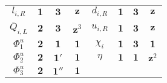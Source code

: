 \documentclass[english,10pt,aps,prd,a4paper,preprintnumbers,floatfix,nofootinbib,showpacs,superscriptaddress]{revtex4-1}
\begin{document}
\begin{table}[ht]
\begin{center}
\begin{tabular}{c c c c || c c c c}
$ l_{i,R} $     \hspace{1cm}    & $\mathbf{1}$    \hspace{1cm}    & $\mathbf{3}$    \hspace{1cm}   &  $\mathbf{z}$      \hspace{1cm}  &		
$ d_{i,R} $     \hspace{1cm}    & $\mathbf{1}$    \hspace{1cm}    & $\mathbf{3}$    \hspace{1cm}   &  $\mathbf{z}$        \\
$ \bar{Q}_{i,L} $  \hspace{1cm}    & $\mathbf{2}$    \hspace{1cm}    & $\mathbf{3}$    \hspace{1cm}   &  $\mathbf{z}^3$    \hspace{1cm}  &		
$ u_{i,R} $     \hspace{1cm}    & $\mathbf{1}$    \hspace{1cm}    & $\mathbf{3}$    \hspace{1cm}   &  $\mathbf{z}$       	\\
\hline
$\Phi_1^u$    \hspace{1cm}        & $\mathbf{2}$      \hspace{1cm}        & $\mathbf{1}$      \hspace{1cm}  	    &  $\mathbf{1}$        \hspace{1cm} &		
$\chi_i$        \hspace{1cm}        & $\mathbf{1}$      \hspace{1cm}   	    & $\mathbf{3}$    	\hspace{1cm} 	    &  $\mathbf{1}$            \\
$\Phi_2^u$    \hspace{1cm}        & $\mathbf{2}$      \hspace{1cm}        & $\mathbf{1'}$     \hspace{1cm}        &  $\mathbf{1}$        \hspace{1cm}     &		             
$\eta$          \hspace{1cm}        & $\mathbf{1}$	\hspace{1cm}        & $\mathbf{1}$      \hspace{1cm}        &  $\mathbf{z}^2$      	      \\
$\Phi_3^u$    \hspace{1cm}        & $\mathbf{2}$	\hspace{1cm}        & $\mathbf{1''}$    \hspace{1cm}        &  $\mathbf{1}$        \hspace{1cm}     &		

\end{tabular}
\end{center}
\end{table}
\end{document}

